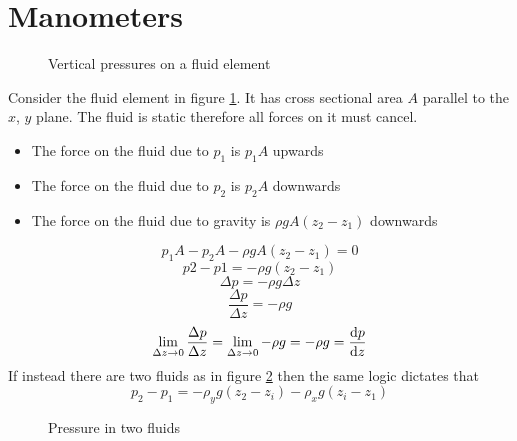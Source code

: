 \documentclass{article}
\begin{document}
    \section{Manometers}
    \begin{figure}[ht]
        \centering
        \caption{Vertical pressures on a fluid element}
        \label{fig:vertical pressure}
    \end{figure}
    Consider the fluid element in figure \ref{fig:vertical pressure}.
    It has cross sectional area \(A\) parallel to the \(x\), \(y\) plane.
    The fluid is static therefore all forces on it must cancel.
    \begin{itemize}
        \item The force on the fluid due to \(p_1\) is \(p_1A\) upwards
        \item The force on the fluid due to \(p_2\) is \(p_2A\) downwards
        \item The force on the fluid due to gravity is \(\rho gA(z_2-z_1)\) downwards
    \end{itemize}
    \[p_1A - p_2A - \rho gA(z_2 - z_1) = 0\]
    \[p2 - p1 = -\rho g(z_2 - z_1)\]
    \[\Delta p = -\rho g\Delta z\]
    \[\frac{\Delta p}{\Delta z} = -\rho g\]
    \[\lim_{\Delta z\to 0}\frac{\Delta p}{\Delta z} = \lim_{\Delta z\to 0}-\rho g = -\rho g = \dv{p}{z}\]
    If instead there are two fluids as in figure \ref{fig:two fluids pressure} then the same logic dictates that
    \[p_2 - p_1 = -\rho_yg(z_2 - z_i) - \rho_xg(z_i - z_1)\]
    \begin{figure}[ht]
        \centering
        \caption{Pressure in two fluids}
        \label{fig:two fluids pressure}
    \end{figure}
\end{document}
